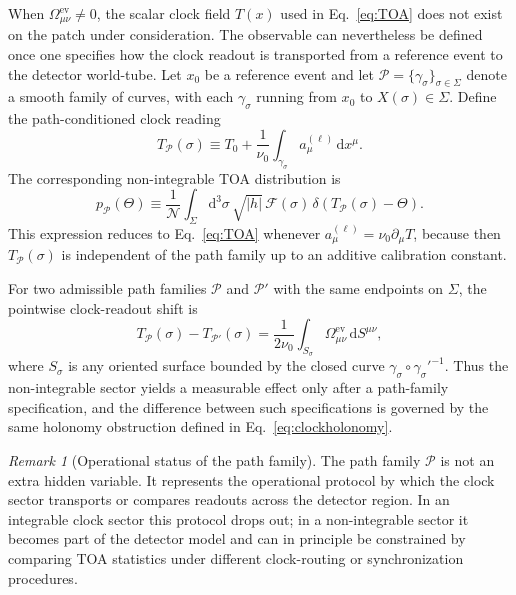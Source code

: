 \documentclass[11pt, a4paper]{article}
\theoremstyle{definition}
\theoremstyle{plain}
\theoremstyle{remark}
\newtheorem{remark}{Remark}[section]
\numberwithin{equation}{section}
\newcommand{\dd}{\mathrm{d}}
\newcommand{\F}{\mathcal{F}}
\begin{document}
        When $\Omega^{\mathrm{ev}}_{\mu\nu}\neq0$, the scalar clock field $T(x)$ used in Eq.~\eqref{eq:TOA} does not exist on the patch under consideration. The observable can nevertheless be defined once one specifies how the clock readout is transported from a reference event to the detector world-tube. Let $x_0$ be a reference event and let $\mathcal{P}=\{\gamma_\sigma\}_{\sigma\in\Sigma}$ denote a smooth family of curves, with each $\gamma_\sigma$ running from $x_0$ to $X(\sigma)\in\Sigma$. Define the path-conditioned clock reading
        \begin{equation}
            T_{\mathcal{P}}(\sigma)
            \equiv
            T_0+
            \frac{1}{\nu_0}
            \int_{\gamma_\sigma}
            a^{(\ell)}_\mu\,\dd x^\mu .
            \label{eq:pathClockOnDetector}
        \end{equation}
        The corresponding non-integrable TOA distribution is
        \begin{equation}
            p_{\mathcal{P}}(\Theta)
            \equiv
            \frac{1}{\mathcal{N}}
            \int_\Sigma \dd^3\sigma\,\sqrt{|h|}\,
            \F(\sigma)\,
            \delta\!\left(T_{\mathcal{P}}(\sigma)-\Theta\right).
            \label{eq:pathTOA}
        \end{equation}
        This expression reduces to Eq.~\eqref{eq:TOA} whenever $a^{(\ell)}_\mu=\nu_0\partial_\mu T$, because then $T_{\mathcal{P}}(\sigma)$ is independent of the path family up to an additive calibration constant.

        For two admissible path families $\mathcal{P}$ and $\mathcal{P}'$ with the same endpoints on $\Sigma$, the pointwise clock-readout shift is
        \begin{equation}
            T_{\mathcal{P}}(\sigma)-T_{\mathcal{P}'}(\sigma)
            =
            \frac{1}{2\nu_0}
            \int_{S_\sigma}
            \Omega^{\mathrm{ev}}_{\mu\nu}\,\dd S^{\mu\nu},
            \label{eq:pathFamilyShift}
        \end{equation}
        where $S_\sigma$ is any oriented surface bounded by the closed curve $\gamma_\sigma\circ\gamma_\sigma'^{-1}$. Thus the non-integrable sector yields a measurable effect only after a path-family specification, and the difference between such specifications is governed by the same holonomy obstruction defined in Eq.~\eqref{eq:clockholonomy}.

        \begin{remark}[Operational status of the path family]
            The path family $\mathcal{P}$ is not an extra hidden variable. It represents the operational protocol by which the clock sector transports or compares readouts across the detector region. In an integrable clock sector this protocol drops out; in a non-integrable sector it becomes part of the detector model and can in principle be constrained by comparing TOA statistics under different clock-routing or synchronization procedures.
        \end{remark}
\end{document}
